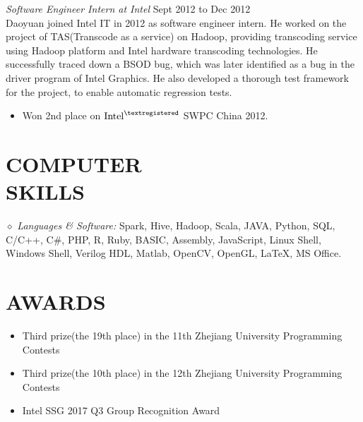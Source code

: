 \documentclass[line,margin]{res}
\begin{document}
\begin{resume}
      {\sl Software Engineer Intern at Intel} \hfill         Sept 2012 to Dec 2012\\
             Daoyuan joined Intel IT in 2012 as software engineer intern. He worked on the project of TAS(Transcode as a service) on Hadoop, providing transcoding service using Hadoop platform and Intel hardware transcoding technologies. He successfully traced down a BSOD bug, which was later identified as a bug in the driver program of Intel Graphics. He also developed a thorough test framework for the project, to enable automatic regression tests.
                  \begin{itemize}
                   \item Won 2nd place on $\textrm{Intel}^{\textregistered}$ SWPC China 2012.
                   \end{itemize}

\section{COMPUTER \\ SKILLS} {$\diamond$ \sl Languages \& Software:} Spark, Hive, Hadoop, Scala, JAVA, Python, SQL, C/C++, C\#, PHP, R, Ruby, BASIC, Assembly, JavaScript, Linux Shell, Windows Shell, Verilog HDL, Matlab, OpenCV, OpenGL, \LaTeX, MS Office. \\


\section{AWARDS}
    \begin{itemize}
            \item Third prize(the 19th place) in the 11th Zhejiang University Programming Contests
            \item Third prize(the 10th place) in the 12th Zhejiang University Programming Contests
            \item Intel SSG 2017 Q3 Group Recognition Award
    \end{itemize}


\end{resume}
\end{document}
